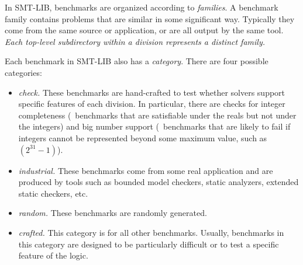 \documentclass[12pt]{article}
\begin{document}
In SMT-LIB, benchmarks are organized according to \emph{families}.  A benchmark
family contains problems that are similar in some significant way.  Typically
they come from the same source or application, or are all output by the same
tool.  \emph{Each top-level subdirectory within a division represents a distinct
family.}  
%

Each benchmark in SMT-LIB also has a \emph{category}.  There are four possible
categories:
%
\begin{itemize}
\item \emph{check.} These benchmarks are hand-crafted to test whether
  solvers support specific features of each division.  In particular,
  there are checks for integer completeness (\ie\ benchmarks that are
  satisfiable under the reals but not under the integers) and big
  number support (\ie\ benchmarks that are likely to fail if integers
  cannot be represented beyond some maximum value, such as
  $(2^{31}-1)$).

  
\item \emph{industrial.} These benchmarks come from some real application
      and are produced by tools such as bounded model checkers, static analyzers, extended
      static checkers, etc.
\item \emph{random.} These benchmarks are randomly generated.
\item \emph{crafted.} This category is for all other benchmarks.  Usually,
  benchmarks in this category are designed to be particularly difficult or to
  test a specific feature of the logic.
\end{itemize}
\end{document}
